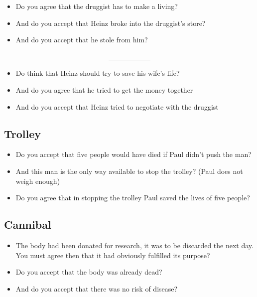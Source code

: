 \begin{itemize}
\tightlist
\item
  Do you agree that the druggist has to make a living?
\item
  And do you accept that Heinz broke into the druggist's store?
\item
  And do you accept that he stole from him?
\end{itemize}

~~~~~~~~~~~~~~~~~~~~~~~~~~~~~~\_\_\_\_\_\_\_\_

\begin{itemize}
\tightlist
\item
  Do think that Heinz should try to save his wife's life?
\item
  And do you agree that he tried to get the money together
\item
  And do you accept that Heinz tried to negotiate with the druggist
\end{itemize}

\subsection{Trolley}\label{trolley-1}

\begin{itemize}
\tightlist
\item
  Do you accept that five people would have died if Paul didn't push the
  man?
\item
  And this man is the only way available to stop the trolley? (Paul does
  not weigh enough)
\item
  Do you agree that in stopping the trolley Paul saved the lives of five
  people?
\end{itemize}

\subsection{Cannibal}\label{cannibal}

\begin{itemize}
\tightlist
\item
  The body had been donated for research, it was to be discarded the
  next day. You must agree then that it had obviously fulfilled its
  purpose?
\item
  Do you accept that the body was already dead?
\item
  And do you accept that there was no risk of disease?
\end{itemize}


